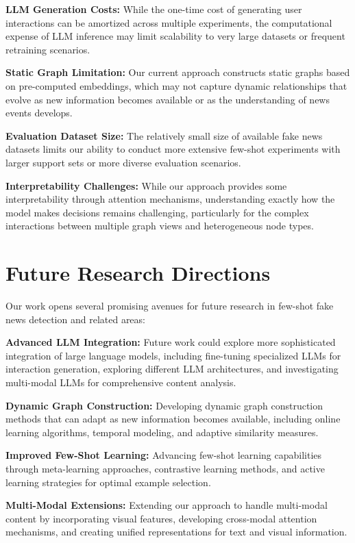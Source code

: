 \textbf{LLM Generation Costs:} While the one-time cost of generating user interactions can be amortized across multiple experiments, the computational expense of LLM inference may limit scalability to very large datasets or frequent retraining scenarios.

\textbf{Static Graph Limitation:} Our current approach constructs static graphs based on pre-computed embeddings, which may not capture dynamic relationships that evolve as new information becomes available or as the understanding of news events develops.

\textbf{Evaluation Dataset Size:} The relatively small size of available fake news datasets limits our ability to conduct more extensive few-shot experiments with larger support sets or more diverse evaluation scenarios.

\textbf{Interpretability Challenges:} While our approach provides some interpretability through attention mechanisms, understanding exactly how the model makes decisions remains challenging, particularly for the complex interactions between multiple graph views and heterogeneous node types.

\section{Future Research Directions}

Our work opens several promising avenues for future research in few-shot fake news detection and related areas:

\textbf{Advanced LLM Integration:} Future work could explore more sophisticated integration of large language models, including fine-tuning specialized LLMs for interaction generation, exploring different LLM architectures, and investigating multi-modal LLMs for comprehensive content analysis.

\textbf{Dynamic Graph Construction:} Developing dynamic graph construction methods that can adapt as new information becomes available, including online learning algorithms, temporal modeling, and adaptive similarity measures.

\textbf{Improved Few-Shot Learning:} Advancing few-shot learning capabilities through meta-learning approaches, contrastive learning methods, and active learning strategies for optimal example selection.

\textbf{Multi-Modal Extensions:} Extending our approach to handle multi-modal content by incorporating visual features, developing cross-modal attention mechanisms, and creating unified representations for text and visual information.

